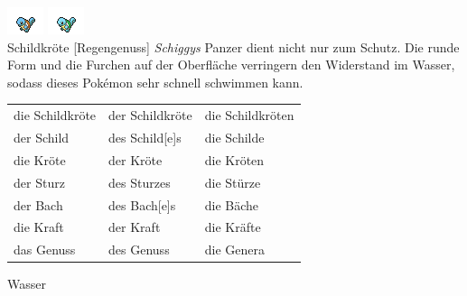 \documentclass[a7paper,10pt,grid=both
,toc
]{kartei}
\begin{document}
\begin{karte}[Sturzbach]{
\includegraphics{../regular/squirtle}
\includegraphics{../shiny/squirtle} \\
Schildkröte
}[Regengenuss]
\emph{Schiggys} Panzer dient nicht nur zum Schutz. Die runde Form und die
Furchen auf der Oberfläche verringern den Widerstand im Wasser, sodass dieses 
Pokémon sehr schnell schwimmen kann.

\vspace{5pt}
\begin{tabular}{lll}
die Schildkröte	&	der Schildkröte	&	die Schildkröten \\
der Schild	&	des Schild[e]s	&	die Schilde \\
die Kröte	&	der Kröte	&	die Kröten \\
der Sturz	&	des Sturzes	&	die Stürze \\
der Bach	&	des Bach[e]s	&	die Bäche \\
die Kraft	&	der Kraft	&	die Kräfte \\
das Genuss	&	des Genuss	&	die Genera \\
\end{tabular}
\vspace{5pt}

Wasser
\end{karte}
\end{document}
